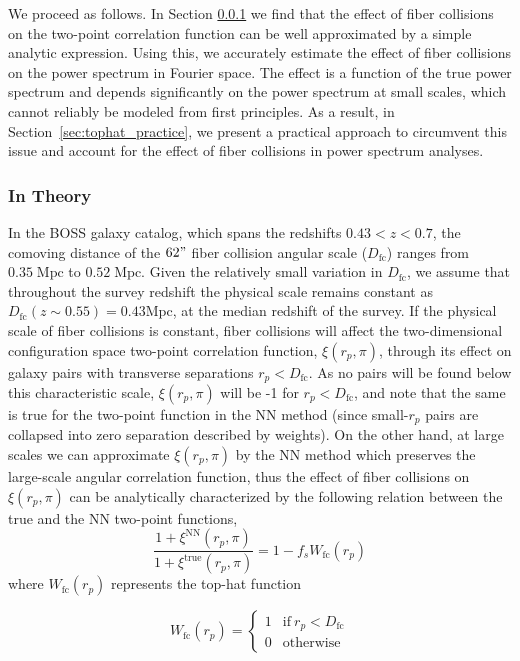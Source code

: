 We proceed as follows. In Section \ref{sec:tophat_theory} we find that the effect of fiber collisions 
on the two-point correlation function can be well approximated by a simple 
analytic expression. Using this, we accurately estimate the 
effect of fiber collisions on the power spectrum in Fourier space. The effect 
is a function of the true power spectrum and depends significantly on the 
power spectrum at small scales, which cannot reliably be modeled from first principles. As a result, in Section~\ref{sec:tophat_practice}, we 
present a practical approach to circumvent this issue and account for the effect of fiber collisions in 
power spectrum analyses. 

\subsubsection{In Theory} \label{sec:tophat_theory}
In the BOSS galaxy catalog, which spans the redshifts $0.43 < z < 0.7$, 
the comoving distance of the $62"$ fiber collision angular scale 
($D_\mathrm{fc}$) ranges from $0.35\;\mathrm{Mpc}$ to $0.52\;\mathrm{Mpc}$. 
Given the relatively small variation in $D_\mathrm{fc}$, we assume 
that throughout the survey redshift the physical scale remains
constant as $D_\mathrm{fc}(z \sim 0.55) = 0.43 \mathrm{Mpc}$, at the median 
redshift of the survey. If the physical scale of fiber collisions is constant, 
fiber collisions will affect the two-dimensional configuration space two-point 
correlation function, $\xi(r_p, \pi)$, through its effect on galaxy pairs with 
transverse separations $r_p < D_\mathrm{fc}$. As no pairs will be found 
below this characteristic scale, $\xi(r_p, \pi)$ will be -1 
for $r_p < D_\mathrm{fc}$, and note that  the same is true for the two-point function in the NN method (since small-$r_p$ pairs are collapsed into zero separation described by weights). On the other hand, at large scales we can approximate $\xi(r_p, \pi)$ by the NN method which preserves the large-scale angular correlation function, thus 
the effect of fiber collisions on $\xi(r_p, \pi)$ can be analytically characterized by  the following relation between the true and the NN two-point functions,
\begin{equation} \label{eq:tophat_2pcf}
\frac{1 + \xi^\mathrm{NN}(r_p, \pi)}{1 + \xi^\mathrm{true}(r_p, \pi)} =1 -  f_s W_\mathrm{fc}(r_p)
\end{equation}
where $W_\mathrm{fc}(r_p)$ represents the top-hat function
\begin{spacing}{1.5}
\begin{equation} \label{eq:tophat}
W_\mathrm{fc}(r_p) = 
\begin{cases}
1 & \text{if}\ r_p < D_\mathrm{fc} \\
0 & \text{otherwise}
\end{cases}
\end{equation}
\end{spacing}
